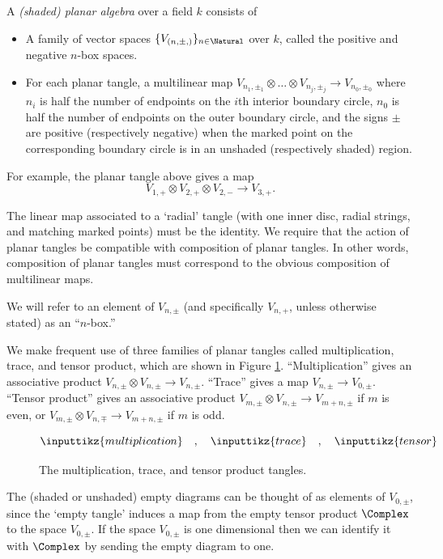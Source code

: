 \begin{defn}
A {\em (shaded) planar algebra} over a field $k$ consists of
\begin{itemize}
\item A family of vector spaces $\{V_{(n,\pm,)}\}_{n\in \Natural}$ over $k$, called the positive and negative $n$-box spaces.
\item For each planar tangle, a multilinear map $V_{n_1, \pm_1} \otimes \ldots \otimes V_{n_j, \pm_j} \rightarrow V_{n_0, \pm_0}$ where $n_i$ is half the number of endpoints on the $i$th interior boundary circle, $n_0$ is half the number of endpoints on the outer boundary circle, and the signs $\pm$ are positive (respectively negative) when the marked point on the corresponding boundary circle is in an unshaded (respectively shaded) region.
\end{itemize}

For example, the planar tangle above gives a map $$V_{1,+} \otimes V_{2,+} \otimes V_{2,-} \rightarrow V_{3,+}.$$

The linear map associated to a `radial' tangle (with one inner disc, radial strings, and matching marked points) must be the identity.
We require that the action of planar tangles be compatible with composition of planar tangles.  In other words, composition of planar tangles must correspond to the obvious composition of multilinear maps.  \end{defn}

We will refer to an element of $V_{n,\pm}$ (and specifically $V_{n,+}$, unless otherwise stated) as an ``$n$-box.''

We make frequent use of three families of planar tangles
called multiplication, trace, and tensor product, which are shown in Figure \ref{fig:timestracetensor}.
``Multiplication'' gives an associative product
$V_{n,\pm} \otimes V_{n,\pm} \rightarrow V_{n,\pm}$.
``Trace'' gives a map $V_{n,\pm} \rightarrow V_{0,\pm}$.
``Tensor product'' gives an associative product
$V_{m,\pm} \otimes V_{n,\pm} \rightarrow V_{m+n,\pm}$ if $m$ is even,
or $V_{m,\pm} \otimes V_{n,\mp} \rightarrow V_{m+n,\pm}$ if $m$ is odd.

\begin{figure}[ht]
$$\inputtikz{multiplication} \quad , \quad \inputtikz{trace} \quad , \quad \inputtikz{tensor}$$
\caption
  {The multiplication, trace, and tensor product tangles.}
\label{fig:timestracetensor}
\end{figure}

The (shaded or unshaded) empty diagrams can be thought of as elements of $V_{0,\pm}$, since the `empty tangle' induces a map from the empty tensor product $\Complex $ to the space $V_{0,\pm}$.  If the space $V_{0,\pm}$ is one dimensional
then we can identify it with $\Complex$  by sending the empty diagram to one.

